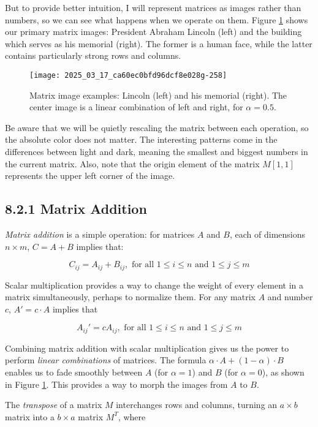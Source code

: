 \documentclass[10pt]{article}
\begin{document}
But to provide better intuition, I will represent matrices as images rather than numbers, so we can see what happens when we operate on them. Figure \ref{fig:matrix_image} shows our primary matrix images: President Abraham Lincoln (left) and the building which serves as his memorial (right). The former is a human face, while the latter contains particularly strong rows and columns.

\begin{figure}[ht]
    \centering
    \texttt{[image: 2025\_03\_17\_ca60ec0bfd96dcf8e028g-258]}
    \caption{Matrix image examples: Lincoln (left) and his memorial (right). The center image is a linear combination of left and right, for $\alpha=0.5$.}
    \label{fig:matrix_image}
\end{figure}

Be aware that we will be quietly rescaling the matrix between each operation, so the absolute color does not matter. The interesting patterns come in the differences between light and dark, meaning the smallest and biggest numbers in the current matrix. Also, note that the origin element of the matrix $M[1,1]$ represents the upper left corner of the image.

\subsection*{8.2.1 Matrix Addition}
\textit{Matrix addition} is a simple operation: for matrices $A$ and $B$, each of dimensions $n \times m$, $C = A + B$ implies that:

\[ C_{ij} = A_{ij} + B_{ij}, \text{ for all } 1 \leq i \leq n \text{ and } 1 \leq j \leq m \]

Scalar multiplication provides a way to change the weight of every element in a matrix simultaneously, perhaps to normalize them. For any matrix $A$ and number $c$, $A' = c \cdot A$ implies that

\[ A_{ij}' = c A_{ij}, \text{ for all } 1 \leq i \leq n \text{ and } 1 \leq j \leq m \]

Combining matrix addition with scalar multiplication gives us the power to perform \textit{linear combinations} of matrices. The formula $\alpha \cdot A + (1-\alpha) \cdot B$ enables us to fade smoothly between $A$ (for $\alpha=1$) and $B$ (for $\alpha=0$), as shown in Figure \ref{fig:matrix_image}. This provides a way to morph the images from $A$ to $B$.

The \textit{transpose} of a matrix $M$ interchanges rows and columns, turning an $a \times b$ matrix into a $b \times a$ matrix $M^T$, where
\end{document}
